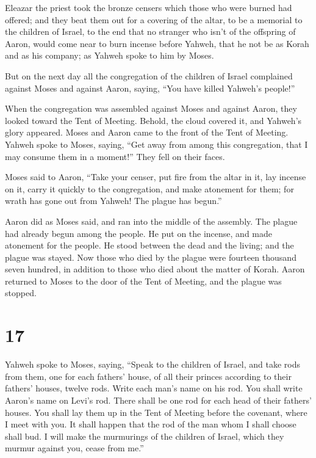  Eleazar the priest took the bronze censers which those who
were burned had offered; and they beat them out for a covering of the
altar,  to be a memorial to the children of Israel, to the
end that no stranger who isn't of the offspring of Aaron, would come
near to burn incense before Yahweh, that he not be as Korah and as his
company; as Yahweh spoke to him by Moses.

 But on the next day all the congregation of the children
of Israel complained against Moses and against Aaron, saying, ``You have
killed Yahweh's people!''

 When the congregation was assembled against Moses and
against Aaron, they looked toward the Tent of Meeting. Behold, the cloud
covered it, and Yahweh's glory appeared.  Moses and Aaron
came to the front of the Tent of Meeting.  Yahweh spoke to
Moses, saying,  ``Get away from among this congregation,
that I may consume them in a moment!'' They fell on their faces.

 Moses said to Aaron, ``Take your censer, put fire from the
altar in it, lay incense on it, carry it quickly to the congregation,
and make atonement for them; for wrath has gone out from Yahweh! The
plague has begun.''

 Aaron did as Moses said, and ran into the middle of the
assembly. The plague had already begun among the people. He put on the
incense, and made atonement for the people.  He stood
between the dead and the living; and the plague was stayed.
 Now those who died by the plague were fourteen thousand
seven hundred, in addition to those who died about the matter of Korah.
 Aaron returned to Moses to the door of the Tent of
Meeting, and the plague was stopped.

\hypertarget{section-16}{%
\section{17}\label{section-16}}

 Yahweh spoke to Moses, saying,  ``Speak to the
children of Israel, and take rods from them, one for each fathers'
house, of all their princes according to their fathers' houses, twelve
rods. Write each man's name on his rod.  You shall write
Aaron's name on Levi's rod. There shall be one rod for each head of
their fathers' houses.  You shall lay them up in the Tent of
Meeting before the covenant, where I meet with you.  It
shall happen that the rod of the man whom I shall choose shall bud. I
will make the murmurings of the children of Israel, which they murmur
against you, cease from me.''


